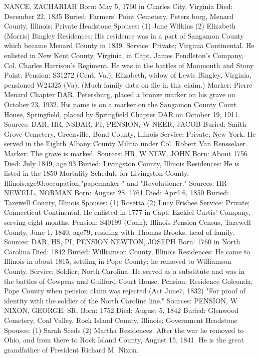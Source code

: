 NANCE, ZACHARIAH 
Born: May 5, 1760 in Charles City, Virginia
Died: December 22, 1835 
Buried: Farmers' Point Cemetery, Peters burg, Menard County, Illinois; Private Headstone 
Spouses: (1) Jane Wilkins
	 (2) Elizabeth (Morris) Bingley
Residences: His residence was in a part of Sangamon County which became Menard County in 1839.
Service: Private; Virginia Continental. He enlisted in New Kent County, Virginia, in Capt. James Pendleton's Company, Col. Charles Harrison's Regiment. He was in the battles of Monmouth and Stony Point. Pension: S31272 (Cent. Va.); Elizabeth, widow of Lewis Bingley, Virginia, pen­sioned W24325 (Va). (Much family data on file in this claim.)
Marker: Pierre Menard Chapter DAR, Petersburg, placed a bronze marker on his grave on October 23, 1932. His name is on a marker on the Sangamon County Court House, Springfield, placed by Springfield Chapter DAR on October 19, 1911.
Sources: DAR, HR, NSDAR, PI, PENSION, W 
NEER, JACOB 
Buried: Smith Grove Cemetery, Greenville, Bond County, Illinois
Service: Private; New York. He served in the Eighth Albany County Militia under Col. Robert Van Rensselaer.
Marker: The grave is marked.
Sources: HR, W 
NEW, JOHN 
Born: About 1756
Died: July 1849, age 93 
Buried: Livingston County, Illinois
Residences: He is listed in the 1850 Mortality Schedule for Livingston County, Illinois,age93;occupation,"papermaker " and "Revolutioner."
Sources: HR 
NEWELL, NORMAN 
Born: August 28, 1761
Died: April 6, 1850 
Buried: Tazewell County, Illinois 
Spouses: (1) Rosetta 
	 (2) Lucy Frisbee
Service: Private; Connecticut Continental. He enlisted in 1777 in Capt. Ezekiel Curtis' Company, serving eight months. 
Pension: S40199 (Conn); Illinois Pension Census, Tazewell County, June 1, 1840, age79, residing with Thomas Brooks, head of family.
Sources: DAR, HS, PI, PENSION 
NEWTON, JOSEPH 
Born: 1760 in North Carolina
Died: 1842 
Buried: Williamson County, Illinois
Residences: He came to Illinois in about 1815, settling in Pope County; he re­moved to Williamson County.
Service: Soldier; North Carolina. He served as a substitute and was in the battles of Cowpens and Guilford Court House. Pension: Residence Golconda, Pope County when pension claim was rejected (Act June7, 1832) "For  proof of identity with the soldier of the North Caro­line line."
Sources: PENSION, W 
NIXON, GEORGE, SR. 
Born: 1752 
Died: August 5, 1842 
Buried: Glenwood Cemetery, Coal Valley, Rock Island County, Illinois; Govern­ment Headstone 
Spouses: (1) Sarah Seeds 
	 (2) Martha 
Residences: After the war he removed to Ohio, and from there to Rock Island County, August 15, 1841. He is the great grandfather of President Richard M. Nixon. 
